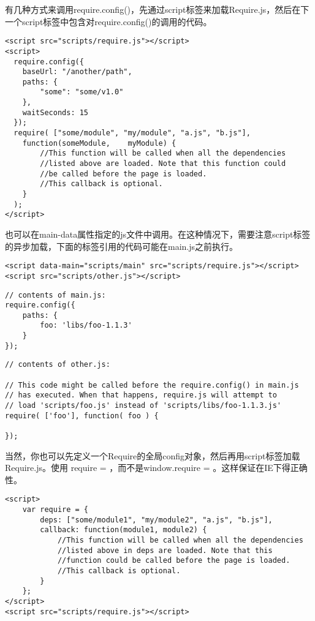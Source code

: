 \documentclass[12pt, oneside, b5paper]{book}
\begin{document}
\begin{CJK}{UTF8}{gkai}
	有几种方式来调用require.config()，先通过script标签来加载Require.js，然后在下一个script标签中包含对require.config()的调用的代码。
	\begin{lstlisting}
<script src="scripts/require.js"></script>
<script>
  require.config({
    baseUrl: "/another/path",
    paths: {
        "some": "some/v1.0"
    },
    waitSeconds: 15
  });
  require( ["some/module", "my/module", "a.js", "b.js"],
    function(someModule,    myModule) {
        //This function will be called when all the dependencies
        //listed above are loaded. Note that this function could
        //be called before the page is loaded.
        //This callback is optional.
    }
  );
</script>
	\end{lstlisting}
	也可以在main-data属性指定的js文件中调用。在这种情况下，需要注意script标签的异步加载，下面的标签引用的代码可能在main.js之前执行。
	\begin{lstlisting}
<script data-main="scripts/main" src="scripts/require.js"></script>
<script src="scripts/other.js"></script>
	\end{lstlisting}
	\begin{lstlisting}
// contents of main.js:
require.config({
    paths: {
        foo: 'libs/foo-1.1.3'
    }
});
	\end{lstlisting}
	\begin{lstlisting}
// contents of other.js:

// This code might be called before the require.config() in main.js
// has executed. When that happens, require.js will attempt to
// load 'scripts/foo.js' instead of 'scripts/libs/foo-1.1.3.js'
require( ['foo'], function( foo ) {

});
	\end{lstlisting}

	当然，你也可以先定义一个Require的全局config对象，然后再用script标签加载Require.js。使用 require = {}，而不是window.require = {}。这样保证在IE下得正确性。

	\begin{lstlisting}
<script>
    var require = {
        deps: ["some/module1", "my/module2", "a.js", "b.js"],
        callback: function(module1, module2) {
            //This function will be called when all the dependencies
            //listed above in deps are loaded. Note that this
            //function could be called before the page is loaded.
            //This callback is optional.
        }
    };
</script>
<script src="scripts/require.js"></script>
	\end{lstlisting}


\end{CJK}
\end{document}
